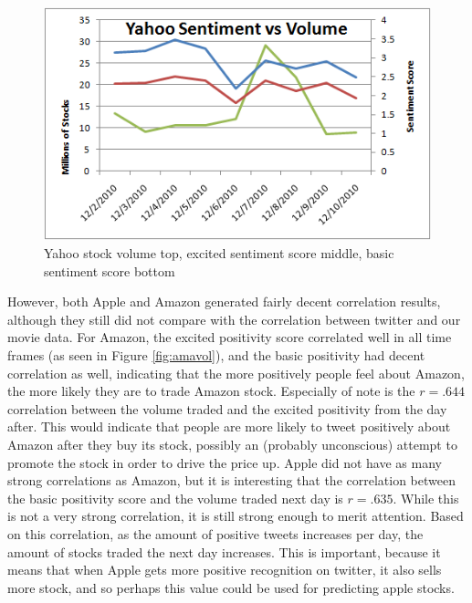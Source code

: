 \documentclass[11pt]{article}
\begin{document}
\begin{figure}[ht!]
\centering
\includegraphics[scale=.55]{img/yahvol.png} 
\caption{Yahoo stock volume top, excited sentiment score middle, basic sentiment score bottom }
\label{fig:yahvol}
\end{figure}

However, both Apple and Amazon generated fairly decent correlation results, although they still did not compare with the correlation between twitter and our movie data.  For Amazon, the excited positivity score correlated well in all time frames (as seen in Figure \ref{fig:amavol}), and the basic positivity had decent correlation as well, indicating that the more positively people feel about Amazon, the more likely they are to trade Amazon stock.  Especially of note is the $r=.644$ correlation between the volume traded and the excited positivity from the day after.  This would indicate that people are more likely to tweet positively about Amazon after they buy its stock, possibly an (probably unconscious) attempt to promote the stock in order to drive the price up.  Apple did not have as many strong correlations as Amazon, but it is interesting that the correlation between the basic positivity score and the volume traded next day is $r=.635$.  While this is not a very strong correlation, it is still strong enough to merit attention.  Based on this correlation, as the amount of positive tweets increases per day, the amount of stocks traded the next day increases.  This is important, because it means that when Apple gets more positive recognition on twitter, it also sells more stock, and so perhaps this value could be used for predicting apple stocks.
\end{document}
